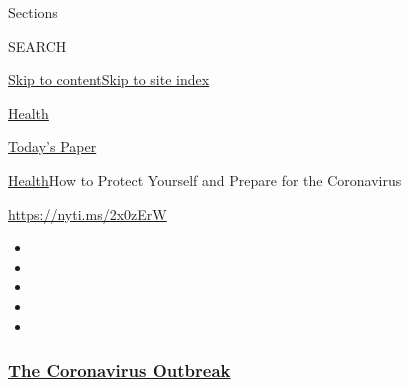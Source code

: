 Sections

SEARCH

\protect\hyperlink{site-content}{Skip to
content}\protect\hyperlink{site-index}{Skip to site index}

\href{https://www.nytimes3xbfgragh.onion/section/health}{Health}

\href{https://myaccount.nytimes3xbfgragh.onion/auth/login?response_type=cookie\&client_id=vi}{}

\href{https://www.nytimes3xbfgragh.onion/section/todayspaper}{Today's
Paper}

\href{/section/health}{Health}\textbar{}How to Protect Yourself and
Prepare for the Coronavirus

\url{https://nyti.ms/2x0zErW}

\begin{itemize}
\item
\item
\item
\item
\item
\end{itemize}

\hypertarget{the-coronavirus-outbreak}{%
\subsubsection{\texorpdfstring{\href{https://www.nytimes3xbfgragh.onion/news-event/coronavirus?name=styln-coronavirus\&region=TOP_BANNER\&block=storyline_menu_recirc\&action=click\&pgtype=Article\&impression_id=1cdae9d0-f4b8-11ea-8069-9bc7b2cf9d32\&variant=undefined}{The
Coronavirus
Outbreak}}{The Coronavirus Outbreak}}\label{the-coronavirus-outbreak}}

